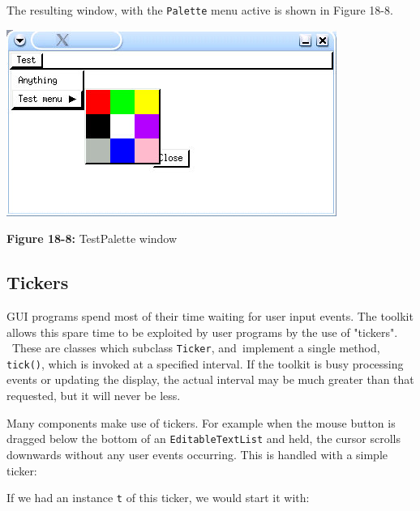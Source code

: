 \bigskip

The resulting window, with the \texttt{Palette} menu active is shown in
Figure 18-8.

\begin{center}
\includegraphics[width=4.2398in,height=2.3953in]{ub-img/ub-img57.jpg}
\end{center}

{\sffamily\bfseries Figure 18-8:}
{\sffamily TestPalette window}

\subsection*{Tickers}

GUI programs spend most of their time waiting for user input
events. The toolkit allows this spare time to be exploited by user
programs by the use of "tickers". \ These
are classes which subclass \texttt{Ticker}, and\texttt{ }implement a
single method, \texttt{tick()}, which is invoked at a specified
interval. If the toolkit is busy processing events or
updating the display, the actual interval may be much greater than that
requested, but it will never be less.

Many components make use of tickers. For example when the mouse button
is dragged below the bottom of an \texttt{EditableTextList} and held,
the cursor scrolls downwards without any user events occurring. This
is handled with a simple ticker:


\noindent
If we had an instance \texttt{t} of this ticker, we would start it with:


